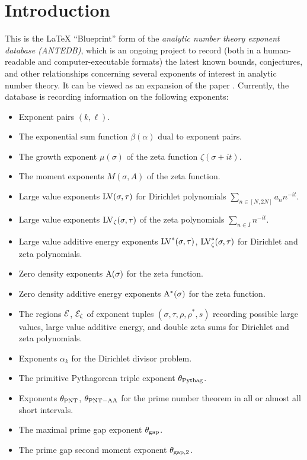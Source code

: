 \chapter{Introduction}

This is the LaTeX ``Blueprint'' form of the \emph{analytic number theory exponent database (ANTEDB)}, which is an ongoing project to record (both in a human-readable and computer-executable formats) the latest known bounds, conjectures, and other relationships concerning several exponents of interest in analytic number theory.  It can be viewed as an expansion of the paper \cite{trudgian-yang}. Currently, the database is recording information on the following exponents:

\begin{itemize}
\item Exponent pairs $(k,\ell)$.
\item The exponential sum function $\beta(\alpha)$ dual to exponent pairs.
\item The growth exponent $\mu(\sigma)$ of the zeta function $\zeta(\sigma+it)$.
\item The moment exponents $M(\sigma,A)$ of the zeta function.
\item Large value exponents $\mathrm{LV}(\sigma, \tau)$ for Dirichlet polynomials $\sum_{n \in [N,2N]} a_n n^{-it}$.
\item Large value exponents $\mathrm{LV}_\zeta(\sigma, \tau)$ of the zeta polynomials $\sum_{n \in I} n^{-it}$.
\item Large value additive energy exponents $\mathrm{LV}^*(\sigma, \tau)$, $\mathrm{LV}^*_\zeta(\sigma, \tau)$ for Dirichlet and zeta polynomials.
\item Zero density exponents $\mathrm{A}(\sigma)$ for the zeta function.
\item Zero density additive energy exponents $\mathrm{A}^*(\sigma)$ for the zeta function.
\item The regions $\mathcal{E}$, $\mathcal{E}_\zeta$ of exponent tuples $(\sigma,\tau,\rho,\rho^*,s)$ recording possible large values, large value additive energy, and double zeta sums for Dirichlet and zeta polynomials.
\item Exponents $\alpha_k$ for the Dirichlet divisor problem.
\item The primitive Pythagorean triple exponent $\theta_{\mathrm{Pythag}}$.
\item Exponents $\theta_{\mathrm{PNT}}$, $\theta_{\mathrm{PNT-AA}}$ for the prime number theorem in all or almost all short intervals.
\item The maximal prime gap exponent $\theta_{\mathrm{gap}}$.
\item The prime gap second moment exponent $\theta_{\mathrm{gap},2}$.
\end{itemize}

